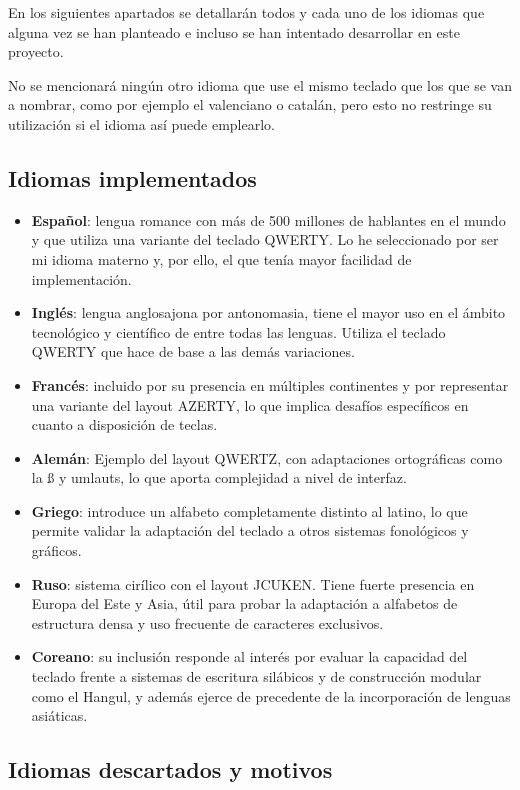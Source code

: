 En los siguientes apartados se detallarán todos y cada uno de los idiomas que alguna vez se han planteado e incluso se han intentado desarrollar en este proyecto.

No se mencionará ningún otro idioma que use el mismo teclado que los que se van a nombrar, como por ejemplo el valenciano o catalán, pero esto no restringe su utilización si el idioma así puede emplearlo.

\subsection{Idiomas implementados}

\begin{itemize}
	\item \textbf{Español}: lengua romance con más de 500 millones de hablantes en el mundo y que utiliza una variante del teclado QWERTY. Lo he seleccionado por ser mi idioma materno y, por ello, el que tenía mayor facilidad de implementación.
	\item \textbf{Inglés}: lengua anglosajona por antonomasia, tiene el mayor uso en el ámbito tecnológico y científico de entre todas las lenguas. Utiliza el teclado QWERTY que hace de base a las demás variaciones.
	\item \textbf{Francés}: incluido por su presencia en múltiples continentes y por representar una variante del layout AZERTY, lo que implica desafíos específicos en cuanto a disposición de teclas.
	\item \textbf{Alemán}: Ejemplo del layout QWERTZ, con adaptaciones ortográficas como la ß y umlauts, lo que aporta complejidad a nivel de interfaz.
	\item \textbf{Griego}: introduce un alfabeto completamente distinto al latino, lo que permite validar la adaptación del teclado a otros sistemas fonológicos y gráficos.
	\item \textbf{Ruso}: sistema cirílico con el layout JCUKEN. Tiene fuerte presencia en Europa del Este y Asia, útil para probar la adaptación a alfabetos de estructura densa y uso frecuente de caracteres exclusivos.
	\item \textbf{Coreano}: su inclusión responde al interés por evaluar la capacidad del teclado frente a sistemas de escritura silábicos y de construcción modular como el Hangul, y además ejerce de precedente de la incorporación de lenguas asiáticas.
\end{itemize}

\subsection{Idiomas descartados y motivos}

